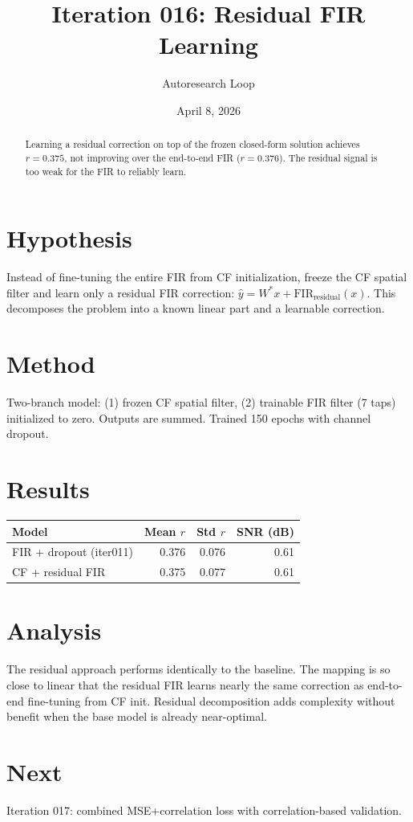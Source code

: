 \documentclass[11pt,a4paper]{article}
\title{Iteration 016: Residual FIR Learning}
\author{Autoresearch Loop}
\date{April 8, 2026}
\begin{document}
\maketitle

\begin{abstract}
Learning a residual correction on top of the frozen closed-form solution
achieves $r=0.375$, not improving over the end-to-end FIR ($r=0.376$).
The residual signal is too weak for the FIR to reliably learn.
\end{abstract}

\section{Hypothesis}
Instead of fine-tuning the entire FIR from CF initialization, freeze the CF
spatial filter and learn only a residual FIR correction:
$\hat{y} = W^*x + \text{FIR}_\text{residual}(x)$. This decomposes the problem
into a known linear part and a learnable correction.

\section{Method}
Two-branch model: (1) frozen CF spatial filter, (2) trainable FIR filter (7 taps)
initialized to zero. Outputs are summed. Trained 150 epochs with channel dropout.

\section{Results}
\begin{table}[H]
\centering
\begin{tabular}{lrrr}
\toprule
Model & Mean $r$ & Std $r$ & SNR (dB) \\
\midrule
FIR + dropout (iter011) & 0.376 & 0.076 & 0.61 \\
CF + residual FIR & 0.375 & 0.077 & 0.61 \\
\bottomrule
\end{tabular}
\end{table}

\section{Analysis}
The residual approach performs identically to the baseline. The mapping is so
close to linear that the residual FIR learns nearly the same correction as
end-to-end fine-tuning from CF init. Residual decomposition adds complexity
without benefit when the base model is already near-optimal.

\section{Next}
Iteration 017: combined MSE+correlation loss with correlation-based validation.
\end{document}
